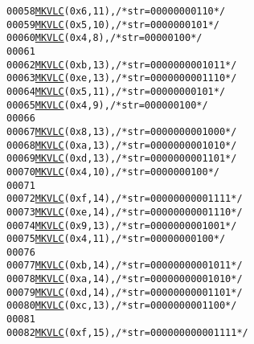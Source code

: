 \begin{footnotesize}
\begin{alltt}
00058         \hyperlink{vlc_8h_aa680b26539d09b5954221ff39a127faa}{MKVLC}( 0x6, 11 ), \textcolor{comment}{/* str=00000000110 */}
00059         \hyperlink{vlc_8h_aa680b26539d09b5954221ff39a127faa}{MKVLC}( 0x5, 10 ), \textcolor{comment}{/* str=0000000101 */}
00060         \hyperlink{vlc_8h_aa680b26539d09b5954221ff39a127faa}{MKVLC}( 0x4, 8 ), \textcolor{comment}{/* str=00000100 */}
00061 
00062         \hyperlink{vlc_8h_aa680b26539d09b5954221ff39a127faa}{MKVLC}( 0xb, 13 ), \textcolor{comment}{/* str=0000000001011 */}
00063         \hyperlink{vlc_8h_aa680b26539d09b5954221ff39a127faa}{MKVLC}( 0xe, 13 ), \textcolor{comment}{/* str=0000000001110 */}
00064         \hyperlink{vlc_8h_aa680b26539d09b5954221ff39a127faa}{MKVLC}( 0x5, 11 ), \textcolor{comment}{/* str=00000000101 */}
00065         \hyperlink{vlc_8h_aa680b26539d09b5954221ff39a127faa}{MKVLC}( 0x4, 9 ), \textcolor{comment}{/* str=000000100 */}
00066 
00067         \hyperlink{vlc_8h_aa680b26539d09b5954221ff39a127faa}{MKVLC}( 0x8, 13 ), \textcolor{comment}{/* str=0000000001000 */}
00068         \hyperlink{vlc_8h_aa680b26539d09b5954221ff39a127faa}{MKVLC}( 0xa, 13 ), \textcolor{comment}{/* str=0000000001010 */}
00069         \hyperlink{vlc_8h_aa680b26539d09b5954221ff39a127faa}{MKVLC}( 0xd, 13 ), \textcolor{comment}{/* str=0000000001101 */}
00070         \hyperlink{vlc_8h_aa680b26539d09b5954221ff39a127faa}{MKVLC}( 0x4, 10 ), \textcolor{comment}{/* str=0000000100 */}
00071 
00072         \hyperlink{vlc_8h_aa680b26539d09b5954221ff39a127faa}{MKVLC}( 0xf, 14 ), \textcolor{comment}{/* str=00000000001111 */}
00073         \hyperlink{vlc_8h_aa680b26539d09b5954221ff39a127faa}{MKVLC}( 0xe, 14 ), \textcolor{comment}{/* str=00000000001110 */}
00074         \hyperlink{vlc_8h_aa680b26539d09b5954221ff39a127faa}{MKVLC}( 0x9, 13 ), \textcolor{comment}{/* str=0000000001001 */}
00075         \hyperlink{vlc_8h_aa680b26539d09b5954221ff39a127faa}{MKVLC}( 0x4, 11 ), \textcolor{comment}{/* str=00000000100 */}
00076 
00077         \hyperlink{vlc_8h_aa680b26539d09b5954221ff39a127faa}{MKVLC}( 0xb, 14 ), \textcolor{comment}{/* str=00000000001011 */}
00078         \hyperlink{vlc_8h_aa680b26539d09b5954221ff39a127faa}{MKVLC}( 0xa, 14 ), \textcolor{comment}{/* str=00000000001010 */}
00079         \hyperlink{vlc_8h_aa680b26539d09b5954221ff39a127faa}{MKVLC}( 0xd, 14 ), \textcolor{comment}{/* str=00000000001101 */}
00080         \hyperlink{vlc_8h_aa680b26539d09b5954221ff39a127faa}{MKVLC}( 0xc, 13 ), \textcolor{comment}{/* str=0000000001100 */}
00081 
00082         \hyperlink{vlc_8h_aa680b26539d09b5954221ff39a127faa}{MKVLC}( 0xf, 15 ), \textcolor{comment}{/* str=000000000001111 */}

\end{alltt}
\end{footnotesize}
